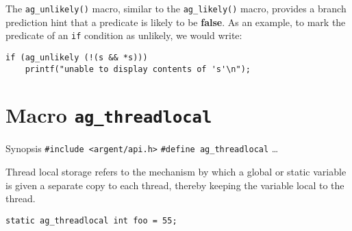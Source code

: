 The \verb|ag_unlikely()| macro, similar to the \verb|ag_likely()| macro,
provides a branch prediction hint that a predicate is likely to be 
\textbf{false}. As an example, to mark the predicate of an \verb|if| condition 
as unlikely, we would write:

\begin{lstlisting}[linewidth=1.0\linewidth,
    caption=Example use of ag\_unlikely()]
if (ag_unlikely (!(s && *s))) 
    printf("unable to display contents of 's'\n");
\end{lstlisting}


%


\section{Macro \texttt{ag\_threadlocal}}

\begin{bclogo}[logo=\bccrayon, noborder=true, barre=snake, couleurBarre=gray]
    {Synopsis}
  \verb|#include <argent/api.h>|
  \verb|#define ag_threadlocal| \ldots
\end{bclogo}

Thread local storage refers to the mechanism by which a global or static
variable is given a separate copy to each thread, thereby keeping the variable
local to the thread.

\begin{lstlisting}[linewidth=1.0\linewidth,
    caption=Example use of ag\_threadlocal]
  static ag_threadlocal int foo = 55;
\end{lstlisting}

